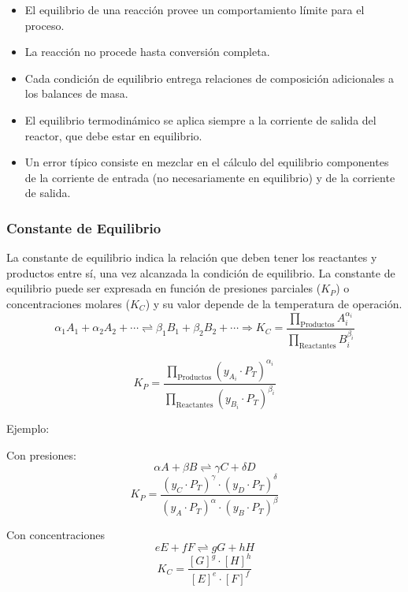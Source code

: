     \begin{itemize}
        \item El equilibrio de una reacción provee un comportamiento límite para el proceso.
        \item La reacción no procede hasta conversión completa.
        \item Cada condición de equilibrio entrega relaciones de composición adicionales a los balances de masa.
        \item El equilibrio termodinámico se aplica siempre a la corriente de salida del reactor, que debe estar en equilibrio.
        \item Un error típico consiste en mezclar en el cálculo del equilibrio componentes de la corriente de entrada (no necesariamente en equilibrio) y de la corriente de salida.
    \end{itemize}
    
        \subsubsection{Constante de Equilibrio}
        
        La constante de equilibrio indica la relación que deben tener los reactantes y productos entre sí, una vez alcanzada la condición de equilibrio. La constante de equilibrio puede ser expresada en función de presiones parciales (\(K_{P}\)) o concentraciones molares (\(K_{C}\)) y su valor depende de la temperatura de operación.
        \begin{equation}
        \label{eq:k_c}
            \alpha_{1} A_{1} + \alpha_{2} A_{2} + \cdots \rightleftharpoons \beta_{1} B_{1} + \beta_{2} B_{2} + \cdots \Rightarrow K_{C} = \frac{\prod_{\text{Productos}} A_{i}^{\alpha_{i}}}{\prod_{\text{Reactantes}} B_{i}^{\beta_{i}}}
        \end{equation}
        
        \begin{equation}
        \label{eq:k_c_pressure}
            K_{P} = \frac{\prod_{\text{Productos}} \left ( y_{A_{i}} \cdot P_{T} \right )^{\alpha_{i}}}{\prod_{\text{Reactantes}} \left ( y_{B_{i}} \cdot P_{T} \right )^{\beta_{i}}}
        \end{equation}
        
        Ejemplo:
        \begin{multicols}{2}
            Con presiones:
            \[\alpha A + \beta B \rightleftharpoons \gamma C + \delta D\]
            \[K_{P} = \frac{\left ( y_{C} \cdot P_{T}\right )^{\gamma} \cdot \left ( y_{D} \cdot P_{T}\right )^{\delta}}{\left ( y_{A} \cdot P_{T}\right )^{\alpha} \cdot \left ( y_{B} \cdot P_{T}\right )^{\beta}}\]
            
            Con concentraciones
            \[e E + f F \rightleftharpoons g G + h H\]
            \[K_{C} = \frac{\left [ G \right ]^{g} \cdot \left [ H \right ]^{h}}{\left [ E \right ]^{e} \cdot \left [ F \right ]^{f}}\]
        \end{multicols}
        
